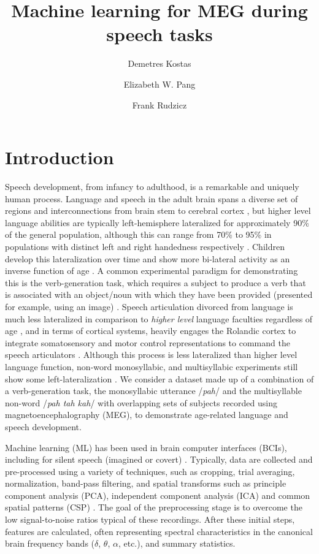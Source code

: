 \documentclass[fleqn,10pt]{wlscirep}
\title{Machine learning for MEG during speech tasks}
\author[1,2,*]{Demetres Kostas}
\author[1,3,4]{Elizabeth W. Pang}
\author[1,2,5]{Frank Rudzicz}
\affil[1]{University of Toronto; Toronto, Canada}
\affil[2]{Vector Institute; Toronto, Canada}
\affil[3]{Hospital for Sick Children; Toronto, Canada}
\affil[4]{SickKids Research Institutue; Toronto, Canada}
\affil[5]{Toronto Rehabilitation Institute-UHN; Toronto, Canada}
\affil[*]{demetres@cs.toronto.edu}
\begin{document}
\flushbottom
\maketitle

\thispagestyle{empty}

\section*{Introduction}

Speech development, from infancy to adulthood, is a remarkable and uniquely human process. Language and speech in the adult brain spans a diverse set of regions and interconnections from brain stem to cerebral cortex \cite{GuentherBook, Tourville2011, Hillis}, but higher level language abilities are typically left-hemisphere lateralized for approximately 90\% of the general population, although this  can range from 70\% to 95\% in populations with distinct left and right handedness respectively \cite{GuentherBook, Kadis2011, Yu2014}. Children develop this lateralization over time and show more bi-lateral activity as an inverse function of age \cite{Kadis2011, Ressel2008}. A common experimental paradigm for demonstrating this is the verb-generation task, which requires a subject to produce a verb that is associated with an object/noun with which they have been provided (presented for example, using an image) \cite{Kadis2011}. Speech articulation divorced from language is much less lateralized in comparison to {\em higher level} language faculties regardless of age \cite{GuentherBook}, and in terms of cortical systems, heavily engages the Rolandic cortex to integrate somatosensory and motor control representations to command the speech articulators \cite{GuentherBook}. Although this process is less lateralized than higher level language function, non-word monosyllabic, and multisyllabic experiments still show some left-lateralization \cite{Ghosh2008a}. We consider a dataset made up of a combination of a verb-generation task, the monosyllabic utterance /{\em pah}/ and the multisyllable non-word /{\em pah tah kah}/ with overlapping sets of subjects recorded using magnetoencephalography (MEG), to demonstrate age-related language and speech development.

Machine learning (ML) has been used in brain computer interfaces (BCIs), including for silent speech (imagined or covert) \cite{Sereshkeh2017, Guimaraes2007, Zhao2015a}. Typically, data are collected and pre-processed using a variety of techniques, such as cropping, trial averaging, normalization, band-pass filtering, and spatial transforms such as principle component analysis (PCA), independent component analysis (ICA) and common spatial patterns (CSP) \cite{RezaeiTabar2016,Muller-Gerking1999}. The goal of the preprocessing stage is to overcome the low signal-to-noise ratios typical of these recordings. After these initial steps, features are calculated, often representing spectral characteristics in the canonical brain frequency bands ($\delta$, $\theta$, $\alpha$, etc.), and summary statistics. 
\end{document}
